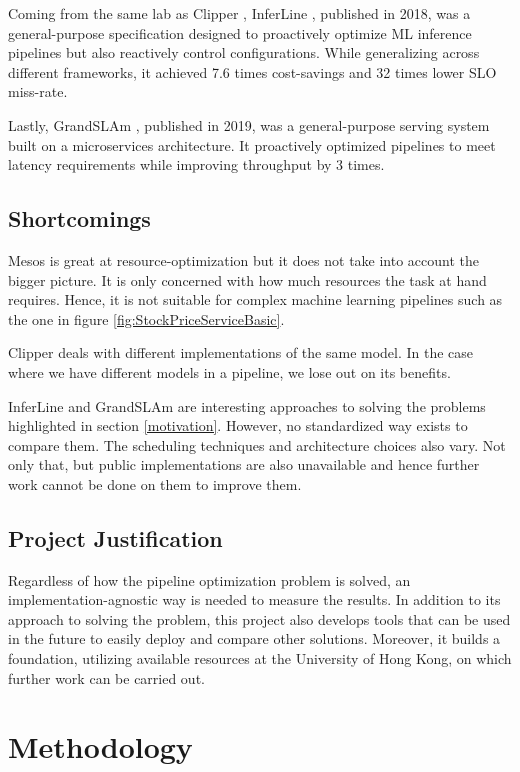 \documentclass{report}
\begin{document}
Coming from the same lab as Clipper \cite{Clipper}, InferLine \cite{InferLine}, published in 2018, was a general-purpose specification designed to proactively optimize ML inference pipelines but also reactively control configurations. While generalizing across different frameworks, it achieved 7.6 times cost-savings and 32 times lower SLO miss-rate.

Lastly, GrandSLAm \cite{GrandSLAm}, published in 2019, was a general-purpose serving system built on a microservices architecture.
It proactively optimized pipelines to meet latency requirements while improving throughput by 3 times.

\section{Shortcomings}

Mesos \cite{Mesos} is great at resource-optimization but it does not take into account the bigger picture.
It is only concerned with how much resources the task at hand requires.
Hence, it is not suitable for complex machine learning pipelines such as the one in figure \ref{fig:StockPriceServiceBasic}.

Clipper \cite{Clipper} deals with different implementations of the same model. In the case where we have different models in a pipeline, we lose out on its benefits.

InferLine \cite{InferLine} and GrandSLAm \cite{GrandSLAm} are interesting approaches to solving the problems highlighted in section \ref{motivation}.
However, no standardized way exists to compare them.
The scheduling techniques and architecture choices also vary.
Not only that, but public implementations are also unavailable and hence further work cannot be done on them to improve them.

\section{Project Justification}

Regardless of how the pipeline optimization problem is solved, an implementation-agnostic way is needed to measure the results.
In addition to its approach to solving the problem, this project also develops tools that can be used in the future to easily deploy and compare other solutions.
Moreover, it builds a foundation, utilizing available resources at the University of Hong Kong, on which further work can be carried out.

\chapter{Methodology}\label{chap:methodology}
\end{document}
